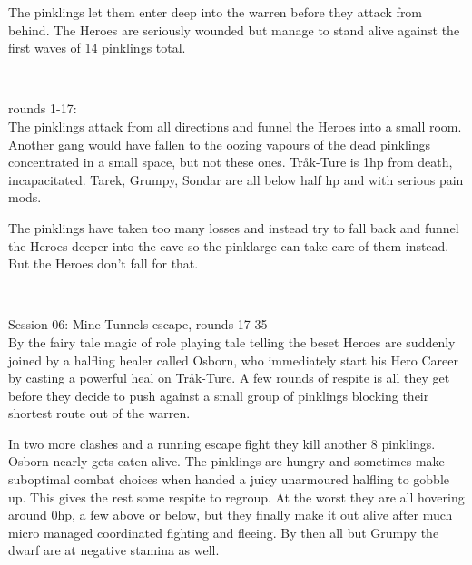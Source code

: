 The pinklings let them enter deep into the warren before they attack from behind. The Heroes are seriously wounded but manage to stand alive against the first waves of 14 pinklings total.

\

rounds 1-17:\\
The pinklings attack from all directions and funnel the Heroes into a small room. Another gang would have fallen to the oozing vapours of the dead pinklings concentrated in a small space, but not these ones. Tråk-Ture is 1hp from death, incapacitated. Tarek, Grumpy, Sondar are all below half hp and with serious pain mods.

The pinklings have taken too many losses and instead try to fall back and funnel the Heroes deeper into the cave so the pinklarge can take care of them instead. But the Heroes don't fall for that.

\

Session 06: Mine Tunnels escape, rounds 17-35\\                         %
By the fairy tale magic of role playing tale telling the beset Heroes are suddenly joined by a halfling healer called Osborn, who immediately start his Hero Career by casting a powerful heal on Tråk-Ture. A few rounds of respite is all they get before they decide to push against a small group of pinklings blocking their shortest route out of the warren.

In two more clashes and a running escape fight they kill another 8 pinklings. Osborn nearly gets eaten alive. The pinklings are hungry and sometimes make suboptimal combat choices when handed a juicy unarmoured halfling to gobble up. This gives the rest some respite to regroup. At the worst they are all hovering around 0hp, a few above or below, but they finally make it out alive after much micro managed coordinated fighting and fleeing. By then all but Grumpy the dwarf are at negative stamina as well.

